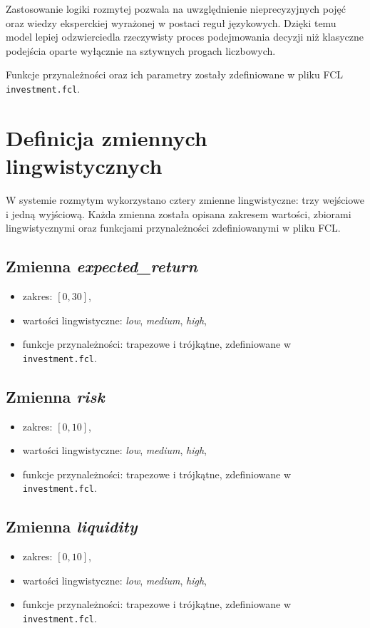 \documentclass[11pt,a4paper]{article}
\begin{document}
Zastosowanie logiki rozmytej pozwala na uwzględnienie nieprecyzyjnych pojęć oraz wiedzy eksperckiej
wyrażonej w postaci reguł językowych. Dzięki temu model lepiej odzwierciedla rzeczywisty proces
podejmowania decyzji niż klasyczne podejścia oparte wyłącznie na sztywnych progach liczbowych.

Funkcje przynależności oraz ich parametry zostały zdefiniowane w pliku FCL \texttt{investment.fcl}.

\section{Definicja zmiennych lingwistycznych}

W systemie rozmytym wykorzystano cztery zmienne lingwistyczne: trzy wejściowe i jedną wyjściową.
Każda zmienna została opisana zakresem wartości, zbiorami lingwistycznymi oraz funkcjami przynależności
zdefiniowanymi w pliku FCL.

\subsection{Zmienna \textit{expected\_return}}
\begin{itemize}
  \item zakres: $[0, 30]$,
  \item wartości lingwistyczne: \textit{low}, \textit{medium}, \textit{high},
  \item funkcje przynależności: trapezowe i trójkątne, zdefiniowane w \texttt{investment.fcl}.
\end{itemize}

\subsection{Zmienna \textit{risk}}
\begin{itemize}
  \item zakres: $[0, 10]$,
  \item wartości lingwistyczne: \textit{low}, \textit{medium}, \textit{high},
  \item funkcje przynależności: trapezowe i trójkątne, zdefiniowane w \texttt{investment.fcl}.
\end{itemize}

\subsection{Zmienna \textit{liquidity}}
\begin{itemize}
  \item zakres: $[0, 10]$,
  \item wartości lingwistyczne: \textit{low}, \textit{medium}, \textit{high},
  \item funkcje przynależności: trapezowe i trójkątne, zdefiniowane w \texttt{investment.fcl}.
\end{itemize}
\end{document}
